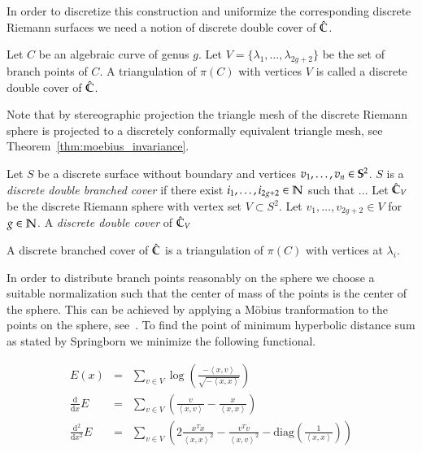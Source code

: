 \documentclass[Thesis.tex]{subfiles}
\begin{document}
In order to discretize this construction and uniformize the corresponding
discrete Riemann surfaces we need a notion of discrete double cover of
$\Chat$.

\begin{definition}
Let $C$ be an algebraic curve of genus $g$. Let $V =
\{\lambda_1,\ldots,\lambda_{2g+2}\}$ be the set of branch points of $C$. A
triangulation of $\pi(C)$ with vertices $V$ is called a discrete double cover
of $\Chat$.  \end{definition}

Note that by stereographic projection the triangle mesh of the discrete
Riemann sphere is projected to a discretely conformally equivalent triangle
mesh, see Theorem~\ref{thm:moebius_invariance}.

\begin{definition}
Let $S$ be a discrete surface without boundary and vertices
$v_1,\ldots,v_n\in\S^2$. $S$ is a \emph{discrete double branched cover} if
there exist $i_1,\ldots, i_{2g+2}\in \N$ such that ...  Let $\Chat_V$ be the discrete Riemann sphere with vertex set
$V\subset S^2$. Let $v_1, \ldots,v_{2g+2} \in V$ for $g\in \N$. A
\emph{discrete double cover} of $\Chat_V$ \end{definition}

A discrete branched cover of $\Chat$ is a triangulation of $\pi(C)$ with
vertices at $\lambda_i$.


In order to distribute branch points reasonably on the sphere we choose
a suitable normalization such that the center of mass of the points is the 
center of the sphere. This can be achieved by applying a M{\"o}bius tranformation
to the points on the sphere, see~\cite{Springborn05}. 
To find the point of minimum hyperbolic distance sum as stated by
Springborn we minimize the following functional. 

\begin{eqnarray*} 
	E(x) &=& \sum_{v\in V}\log\left(\frac{-\left<x,v\right>}{\sqrt{-\left<x,x\right>}}\right)\\
	\frac{\mathrm d}{\mathrm dx}E &=& \sum_{v\in V}\left(\frac{v}{\left<x,v\right>} - \frac{x}{\left<x,x\right>}\right)\\
	\frac{\mathrm d^2}{\mathrm dx^2}E &=& \sum_{v\in V}\left(2\frac{x^Tx}{\left<x,x\right>^2}-\frac{v^Tv}{\left<x,v\right>^2} - \mathrm{diag}\left(\frac{1}{\left<x,x\right>}\right)\right)
\end{eqnarray*}
\end{document}
